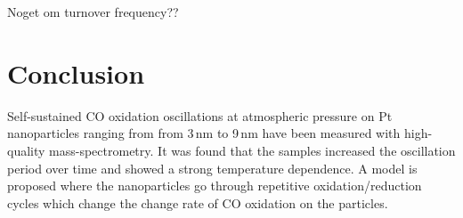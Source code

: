 \documentclass[8.5pt,twoside,twocolumn]{article}
\begin{document}
Noget om turnover frequency??

\section{Conclusion}
Self-sustained CO oxidation oscillations at atmospheric pressure on Pt nanoparticles ranging from from 3\,nm to 9\,nm have been measured with high-quality mass-spectrometry. It was found that the samples increased the oscillation period over time and showed a strong temperature dependence. A model is proposed where the nanoparticles go through repetitive oxidation/reduction cycles which change the change rate of CO oxidation on the particles. 








\end{document}
